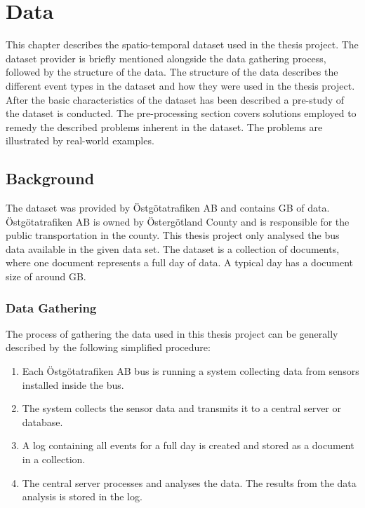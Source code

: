 \chapter{Data}
\label{cha:data}

This chapter describes the spatio-temporal dataset used in the thesis project.
The dataset provider is briefly mentioned alongside the data gathering process, followed by the structure of the data.
The structure of the data describes the different event types in the dataset and how they were used in the thesis project.
After the basic characteristics of the dataset has been described a pre-study of the dataset is conducted.
The pre-processing section covers solutions employed to remedy the described problems inherent in the dataset.
The problems are illustrated by real-world examples.

\section{Background}
The dataset was provided by Östgötatrafiken AB and contains GB of data.
Östgötatrafiken AB is owned by Östergötland County and is responsible for the public transportation in the county.
This thesis project only analysed the bus data available in the given data set.
The dataset is a collection of documents, where one document represents a full day of data.
A typical day has a document size of around GB.

\subsection{Data Gathering}
The process of gathering the data used in this thesis project can be generally described by the following simplified procedure:
\begin{enumerate}
    \item Each Östgötatrafiken AB bus is running a system collecting data from sensors installed inside the bus.
    \item The system collects the sensor data and transmits it to a central server or database.
    \item A log containing all events for a full day is created and stored as a document in a collection.
    \item The central server processes and analyses the data. The results from the data analysis is stored in the log.
\end{enumerate}

